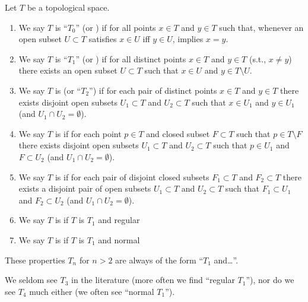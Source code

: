 \begin{definition}
Let $T$ be a topological space.
\begin{enumerate}
\item We say $T$ is ``$T_{0}$'' (or )
  if for all points $x\in T$ and $y\in T$
  such that, whenever an open subset $U\subset T$ satisfies $x\in U$
  iff $y\in U$, implies $x = y$.
\item%
  We say $T$ is ``$T_{1}$'' (or )
  if for all distinct points $x\in T$ and $y\in T$ (s.t., $x\neq y$)
  there exists an open subset $U\subset T$ such that $x\in U$ and
  $y\in T\setminus U$.
\item%
  We say $T$ is  (or ``$T_{2}$'')
  if for each pair of distinct points $x\in T$ and $y\in T$ 
  there exists disjoint open subsets $U_{1}\subset T$ and
  $U_{2}\subset T$ such that $x\in U_{1}$ and $y\in U_{1}$ (and
  $U_{1}\cap U_{2}=\emptyset$).
\item%
  We say $T$ is  if
  for each point $p\in T$ and closed subset $F\subset T$ such that
  $p\in T\setminus F$ there exists disjoint open subsets $U_{1}\subset T$ and
  $U_{2}\subset T$ such that $p\in U_{1}$ and $F\subset U_{2}$ (and
  $U_{1}\cap U_{2}=\emptyset$).
\item%
  We say $T$ is  if
  for each pair of disjoint closed subsets $F_{1}\subset T$ and
  $F_{2}\subset T$ there exists a disjoint pair of open subsets
  $U_{1}\subset T$ and $U_{2}\subset T$ such that $F_{1}\subset U_{1}$
  and $F_{2}\subset U_{2}$ (and $U_{1}\cap U_{2}=\emptyset$).
\item%
  We say $T$ is  if $T$ is $T_{1}$ and regular
\item%
  We say $T$ is  if $T$ is $T_{1}$ and normal
\end{enumerate}
\end{definition}

\begin{remark}[Terminology]
These properties $T_{n}$ for $n>2$ are always of the form ``$T_{1}$ and\dots''.

We seldom see $T_{3}$ in the literature (more often we find ``regular $T_{1}$''),
nor do we see $T_{4}$ much either (we often see ``normal $T_{1}$'').
\end{remark}


